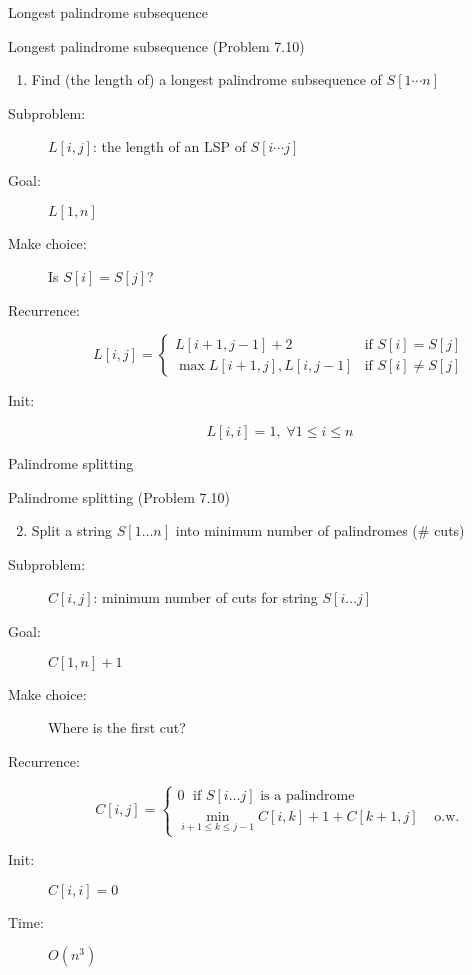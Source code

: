 \begin{frame}{Longest palindrome subsequence}
  \begin{exampleblock}{Longest palindrome subsequence (Problem 7.10)}
	\begin{enumerate}[(1)]
      \item Find (the length of) a longest palindrome subsequence of $S[1 \cdots n]$
    \end{enumerate}
  \end{exampleblock}

  \begin{description}
	\item[Subproblem:] $L[i,j]$: the length of an LSP of $S[i \cdots j]$
	\item[Goal:] $L[1,n]$
	  \pause
	\item[Make choice:] Is $S[i] = S[j]$?
	\item[Recurrence:] 
	  \begin{displaymath}
		L[i,j] = \left\{ \begin{array}{ll}
		  L[i+1, j-1] + 2 & \text{if } S[i] = S[j]  \\
		  \max{L[i+1,j], L[i,j-1]} & \text{if } S[i] \neq S[j]
		\end{array} \right.
	  \end{displaymath}
	  \pause
	\item[Init:]
	  \[
		L[i,i] = 1, \; \forall 1 \le i \le n
	  \]
  \end{description}
\end{frame}
\begin{frame}{Palindrome splitting}
  \begin{exampleblock}{Palindrome splitting (Problem 7.10)}
	\begin{enumerate}[(1)]
	  \setcounter{enumi}{1}
	  \item Split a string $S[1 \dots n]$ into minimum number of palindromes (\# cuts)
    \end{enumerate}
  \end{exampleblock}

  \begin{description}
	\item[Subproblem:] $C[i,j]$: minimum number of cuts for string $S[i \dots j]$
	\item[Goal:] $C[1,n] + 1$
	  \pause
	\item[Make choice:] Where is the first cut?
	\item[Recurrence:] 
	  \[
		C[i,j] = \left\{ \begin{array}{ll}
		  0	\; \text{ if } S[i \dots j] \text{ is a palindrome} & \\
		  \min\limits_{i+1 \le k \le j-1} C[i,k] + 1 + C[k+1,j] & \text{ o.w.}
		\end{array} \right.
	  \]
	  \pause
	\item[Init:] $C[i,i] = 0$
	\item[Time:] $O(n^3)$
  \end{description}
\end{frame}
